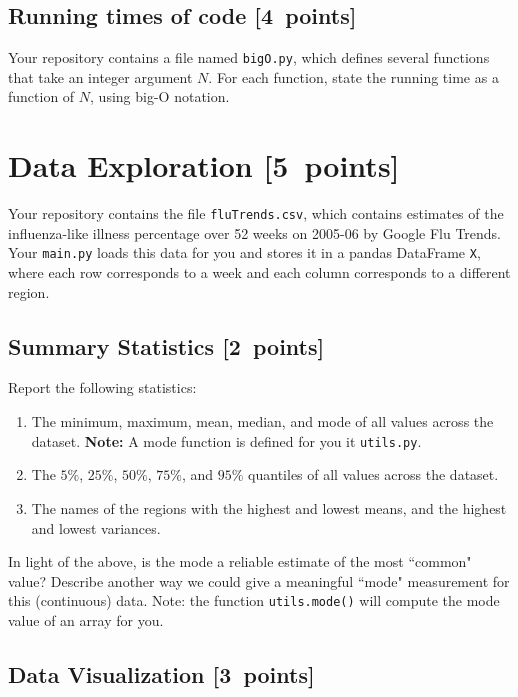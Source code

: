 \documentclass{article}
\newcommand{\blu}[1]{{\textcolor{blu}{#1}}}
\let\ask\blu
\newcommand\pts[1]{\textcolor{pointscolour}{[#1~points]}}
\begin{document}
  \subsection{Running times of code \pts{4}}

  Your repository contains a file named \texttt{bigO.py}, which defines several functions
  that take an integer argument $N$. For each function, \ask{state the running time as a function of $N$, using big-O notation}.


  \section{Data Exploration \pts{5}}


  Your repository contains the file \texttt{fluTrends.csv}, which contains estimates
  of the influenza-like illness percentage over 52 weeks on 2005-06 by Google Flu Trends.
  Your \texttt{main.py} loads this data for you and stores it in a pandas DataFrame \texttt{X},
  where each row corresponds to a week and each column
  corresponds to a different
  region.

  \subsection{Summary Statistics \pts{2}}

  \ask{Report the following statistics}:
  \begin{enumerate}
  \item The minimum, maximum, mean, median, and mode of all values across the dataset. \textbf{Note:} A mode function is defined for you it \texttt{utils.py}.
  \item The $5\%$, $25\%$, $50\%$, $75\%$, and $95\%$ quantiles of all values across the dataset.
  \item The names of the regions with the highest and lowest means, and the highest and lowest variances.
  \end{enumerate}
  In light of the above, \ask{is the mode a reliable estimate of the most ``common" value? Describe another way we could give a meaningful ``mode" measurement for this (continuous) data.} Note: the function \texttt{utils.mode()} will compute the mode value of an array for you.


  \subsection{Data Visualization \pts{3}}
\end{document}
